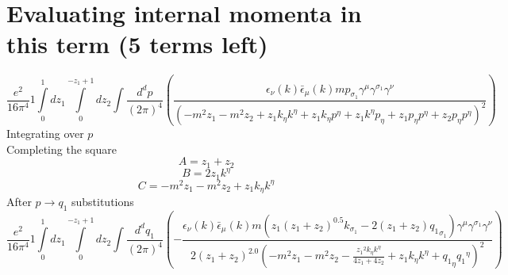 \section*{Evaluating internal momenta in this term (5 terms left)}
\begin{dmath}\frac{e^{2}}{16 \pi^{4}}1\int\limits_{ 0 }^{ 1 } d{ z_{ 1 } }\int\limits_{ 0 }^{ - { z_{ 1 } } + 1 } d{ z_{ 2 } }\int\frac{d^d p }{ (2\pi)^4 }\left(\frac{\epsilon_{ \nu }({ k }) \bar{\epsilon}_{ \mu }({ k }) m { { p }_{ \sigma_1 } } { \gamma^{ \mu } } { \gamma^{ \sigma_1 } } { \gamma^{ \nu } }}{\left(- m^{2} { z_{ 1 } } - m^{2} { z_{ 2 } } + { z_{ 1 } } { { k }_{ \eta } } { { k }^{ \eta } } + { z_{ 1 } } { { k }_{ \eta } } { { p }^{ \eta } } + { z_{ 1 } } { { k }^{ \eta } } { { p }_{ \eta } } + { z_{ 1 } } { { p }_{ \eta } } { { p }^{ \eta } } + { z_{ 2 } } { { p }_{ \eta } } { { p }^{ \eta } }\right)^{2}}\right)\end{dmath}
Integrating over $p$\\
Completing the square\
\begin{dmath}A = { z_{ 1 } } + { z_{ 2 } }\end{dmath}
\begin{dmath}B = 2 { z_{ 1 } } { { k }^{ \eta } }\end{dmath}
\begin{dmath}C = - m^{2} { z_{ 1 } } - m^{2} { z_{ 2 } } + { z_{ 1 } } { { k }_{ \eta } } { { k }^{ \eta } }\end{dmath}
After $p \to q_1$ substitutions
\begin{dmath}\frac{e^{2}}{16 \pi^{4}}1\int\limits_{ 0 }^{ 1 } d{ z_{ 1 } }\int\limits_{ 0 }^{ - { z_{ 1 } } + 1 } d{ z_{ 2 } }\int\frac{d^d q_1 }{ (2\pi)^4 }\left(- \frac{\epsilon_{ \nu }({ k }) \bar{\epsilon}_{ \mu }({ k }) m \left({ z_{ 1 } } \left({ z_{ 1 } } + { z_{ 2 } }\right)^{0.5} { { k }_{ \sigma_1 } } - 2 \left({ z_{ 1 } } + { z_{ 2 } }\right) { { q_1 }_{ \sigma_1 } }\right) { \gamma^{ \mu } } { \gamma^{ \sigma_1 } } { \gamma^{ \nu } }}{2 \left({ z_{ 1 } } + { z_{ 2 } }\right)^{2.0} \left(- m^{2} { z_{ 1 } } - m^{2} { z_{ 2 } } - \frac{{ z_{ 1 } }^{2} { { k }_{ \eta } } { { k }^{ \eta } }}{4 { z_{ 1 } } + 4 { z_{ 2 } }} + { z_{ 1 } } { { k }_{ \eta } } { { k }^{ \eta } } + { { q_1 }_{ \eta } } { { q_1 }^{ \eta } }\right)^{2}}\right)\end{dmath}
